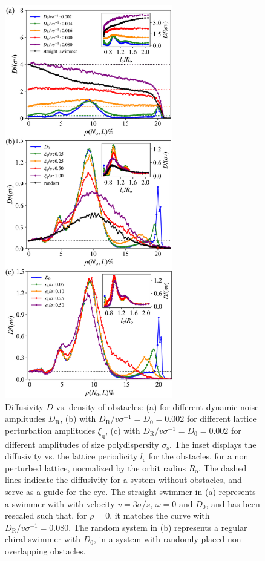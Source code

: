 \documentclass[aps,pre,twocolumn,showpacs,superscriptaddress,amsmath,amssymb,longbibliography]{revtex4-2}
\begin{document}
\begin{figure}[ht!]
\centering
  \includegraphics[height=17.2cm]{fig_4.png}
  \caption{Diffusivity $D$ vs. density of obstacles: (a) for different dynamic noise amplitudes $D_{\textrm{R}}$, (b) with $D_{\textrm{R}}/v\sigma^{-1}=D_{\textrm{0}}=0.002$ for different lattice perturbation amplitudes $\xi_{\textrm{q}}$, (c) with $D_{\textrm{R}}/v\sigma^{-1}=D_{\textrm{0}}=0.002$ for different amplitudes of size polydispersity $\sigma_{\textrm{s}}$. The inset displays the diffusivity vs. the lattice periodicity $l_{\textrm{c}}$ for the obstacles, for a non perturbed lattice, normalized by the orbit radius $R_{\textrm{o}}$. The dashed lines indicate the diffusivity for a system without obstacles, and serve as a guide for the eye. The straight swimmer in (a) represents a swimmer with with velocity $v=3\sigma/s$, $\omega =0$ and $D_{\textrm{0}}$, and has been rescaled such that, for $\rho=0$, it matches the curve with $D_{\textrm{R}}/v\sigma^{-1}=0.080$. The random system in (b) represents a regular chiral swimmer with $D_{\textrm{0}}$, in a system with randomly placed non overlapping obstacles.}
  \label{fig_3}
\end{figure}
\end{document}
